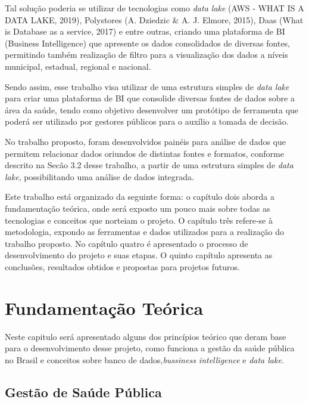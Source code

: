 \documentclass[
	12pt,				%
	openright,			%
	oneside,			%
	a4paper,			%
	chapter=TITLE,		%
	section=TITLE,		%
	subsection=TITLE,	%
	subsubsection=TITLE,%
	english,			%
	brazil				%
	]{abntex2}
\theoremstyle{definition}
\begin{document}
    Tal solução poderia se utilizar de tecnologias como \textit{data lake} (AWS - WHAT IS A DATA LAKE, 2019), Polystores (A. Dziedzic & A. J. Elmore, 2015),
    Daas (What is Database as a service, 2017) e entre outras, criando uma plataforma de BI (Business Intelligence) que apresente os dados consolidados de diversas fontes, permitindo também realização de filtro para a visualização dos dados a níveis municipal, estadual, regional e nacional.
    
    Sendo assim, esse trabalho visa utilizar de uma estrutura simples de \textit{data lake} para criar uma plataforma de BI que consolide diversas fontes de
    dados sobre a área da saúde, tendo como objetivo desenvolver um protótipo de ferramenta que poderá ser utilizado por gestores públicos para o auxílio a tomada de decisão.
    
    No trabalho proposto, foram desenvolvidos painéis para análise de dados que permitem relacionar dados oriundos de distintas fontes e formatos, conforme descrito na Secão 3.2 desse trabalho, a partir de uma estrutura simples de \textit{data lake}, possibilitando uma análise de dados integrada.
    
    Este trabalho está organizado da seguinte forma: o capítulo dois aborda a fundamentação teórica, onde será exposto um pouco mais sobre todas as tecnologias e conceitos que norteiam o projeto. O capítulo três refere-se à metodologia, expondo as ferramentas e dados utilizados para a realização do trabalho proposto. No capítulo quatro é apresentado o processo de desenvolvimento do projeto e suas etapas. O quinto capítulo apresenta as conclusões, resultados obtidos e propostas para projetos futuros. 

\chapter{Fundamentação Teórica}
    Neste capitulo será apresentado alguns dos princípios teórico que deram base para o desenvolvimento desse projeto, como funciona a gestão da saúde pública no Brasil e conceitos sobre banco de dados,\textit{bussiness intelligence} e \textit{data lake}. 
    
\section{Gestão de Saúde Pública}
\end{document}
